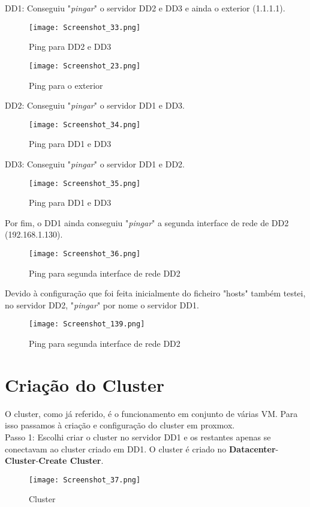 DD1: Conseguiu "\textit{pingar}" o servidor DD2 e DD3 e ainda o exterior (1.1.1.1).
\begin{figure}[H]
\center
\texttt{[image: Screenshot\_33.png]}
\caption{Ping para DD2 e DD3}
\end{figure}

\begin{figure}[H]
\center
\texttt{[image: Screenshot\_23.png]}
\caption{Ping para o exterior}
\end{figure}

\newpage
DD2: Conseguiu "\textit{pingar}" o servidor DD1 e DD3.
\begin{figure}[H]
\center
\texttt{[image: Screenshot\_34.png]}
\caption{Ping para DD1 e DD3}
\end{figure}

DD3: Conseguiu "\textit{pingar}" o servidor DD1 e DD2.
\begin{figure}[H]
\center
\texttt{[image: Screenshot\_35.png]}
\caption{Ping para DD1 e DD3}
\end{figure}

\newpage
Por fim, o DD1 ainda conseguiu "\textit{pingar}" a segunda interface de rede de DD2 (192.168.1.130).
\begin{figure}[H]
\center
\texttt{[image: Screenshot\_36.png]}
\caption{Ping para segunda interface de rede DD2}
\end{figure}


Devido à configuração que foi feita inicialmente do ficheiro "hosts" também testei, no servidor DD2, "\textit{pingar}" por nome o servidor DD1.
\begin{figure}[H]
\center
\texttt{[image: Screenshot\_139.png]}
\caption{Ping para segunda interface de rede DD2}
\end{figure}

\newpage
\section{Criação do Cluster}
O cluster, como já referido, é o funcionamento em conjunto de várias \ac{VM}. Para isso passamos à criação e configuração do cluster em proxmox.\\

Passo 1: Escolhi criar o cluster no servidor DD1 e os restantes apenas se conectavam ao cluster criado em DD1. O cluster é criado no \textbf{Datacenter}-\textbf{Cluster}-\textbf{Create Cluster}.
\begin{figure}[H]
\center
\texttt{[image: Screenshot\_37.png]}
\caption{Cluster}
\end{figure}

